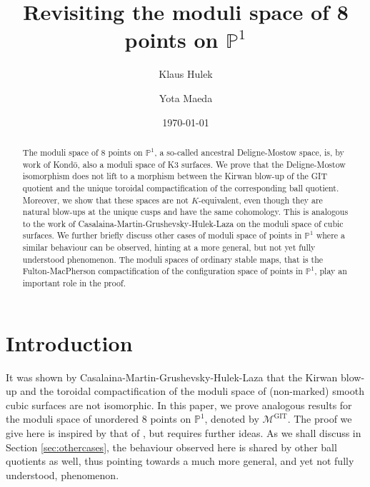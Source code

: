 \documentclass[12pt, pdftex]{amsart}
\theoremstyle{plain}
\theoremstyle{definition}
\numberwithin{equation}{section}
\def\P{{\mathbb P}}
\def\GIT{\mathrm{GIT}}
\def\M{\mathcal{M}}
\begin{document}
\title[Revisiting the moduli space of 8 points on $\mathbb{P}^1$]
{Revisiting the moduli space of 8 points on $\mathbb{P}^1$}

\author{Klaus Hulek}
\address{K.H: Institut f\"ur Algebraische Geometriem, Leibniz University Hannover, Welfengarten 1, 30060 Hannover, Germany}
\author{Yota Maeda}
\address{Y.M: Department of Mathematics, Faculty of Science, Kyoto University, Kyoto 606-8502, Japan/Advanced Research Laboratory, R\&D Center, Sony Group Corporations, 1-7-1 Konan, Minato-ku, Tokyo, 108-0075, Japan}


\date{\today}

\maketitle
\begin{abstract}
The moduli space of $8$ points on $\mathbb{P}^1$, a so-called ancestral Deligne-Mostow space, is, by work of Kond\={o}, also a moduli space of K3 surfaces. 
We prove that the Deligne-Mostow isomorphism does not lift to a morphism  between the  Kirwan blow-up of the GIT quotient  and the unique toroidal compactification of the corresponding ball quotient.
Moreover, we show that these spaces are not $K$-equivalent, even though they are natural blow-ups at the unique cusps and have the same cohomology.
This is analogous to the work of Casalaina-Martin-Grushevsky-Hulek-Laza on the moduli space of cubic surfaces.
We further briefly discuss other cases of  moduli space of points in $\mathbb{P}^1$ where a similar behaviour can be observed, hinting at a more general, but not yet fully understood phenomenon.   
The moduli spaces of ordinary stable maps, that is the  Fulton-MacPherson compactification of the configuration space of points in $\mathbb{P}^1$,  play an important role in the proof. 
\end{abstract}

\section{Introduction}
It was shown by Casalaina-Martin-Grushevsky-Hulek-Laza \cite{CMGHL22} that the Kirwan blow-up and the toroidal compactification of the moduli space of (non-marked) smooth cubic surfaces are not isomorphic.
In this paper, we prove analogous results for the moduli space of unordered 8 points on $\P^1$, denoted by $\M^{\GIT}$.
The proof we give here is inspired by that of  \cite{CMGHL22}, but requires further ideas.
As we shall discuss in Section \ref{sec:othercases}, the behaviour observed here is shared 
by other ball quotients as well, thus pointing towards a much more general, and yet not fully understood, phenomenon.
\end{document}
